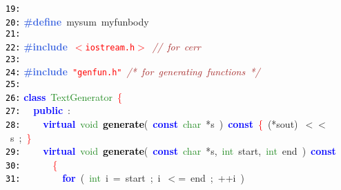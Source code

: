 \documentclass{article}
\begin{document}
\mbox{}\texttt{\textcolor{Black}{19:}}  \\
\mbox{}\texttt{\textcolor{Black}{20:}} \textbf{\textcolor{RoyalBlue}{\#define}}\ \label{test.h:20}mysum\ myfunbody\  \\
\mbox{}\texttt{\textcolor{Black}{21:}}  \\
\mbox{}\texttt{\textcolor{Black}{22:}} \textbf{\textcolor{RoyalBlue}{\#include}}\ \texttt{\textcolor{Red}{$<$iostream.h$>$}}\ \textit{\textcolor{Brown}{//\ for\ cerr}} \\
\mbox{}\texttt{\textcolor{Black}{23:}}  \\
\mbox{}\texttt{\textcolor{Black}{24:}} \textbf{\textcolor{RoyalBlue}{\#include}}\ \texttt{\textcolor{Red}{"{}genfun.h"{}}}\ \textit{\textcolor{Brown}{/*\ for\ generating\ functions\ */}} \\
\mbox{}\texttt{\textcolor{Black}{25:}}  \\
\mbox{}\texttt{\textcolor{Black}{26:}} \textbf{\textcolor{Blue}{class}}\ \textcolor{ForestGreen}{\label{test.h:26}TextGenerator}\ \textcolor{Red}{\{} \\
\mbox{}\texttt{\textcolor{Black}{27:}} \ \ \textbf{\textcolor{Blue}{public}}\ \textcolor{BrickRed}{:} \\
\mbox{}\texttt{\textcolor{Black}{28:}} \ \ \ \ \textbf{\textcolor{Blue}{virtual}}\ \textcolor{ForestGreen}{void}\ \textbf{\textcolor{Black}{\label{test.h:28}generate}}\textcolor{BrickRed}{(}\ \textbf{\textcolor{Blue}{const}}\ \textcolor{ForestGreen}{char}\ \textcolor{BrickRed}{*}s\ \textcolor{BrickRed}{)}\ \textbf{\textcolor{Blue}{const}}\ \textcolor{Red}{\{}\ \textcolor{BrickRed}{(*}sout\textcolor{BrickRed}{)}\ \textcolor{BrickRed}{$<$$<$}\ s\ \textcolor{BrickRed}{;}\ \textcolor{Red}{\}} \\
\mbox{}\texttt{\textcolor{Black}{29:}} \ \ \ \ \textbf{\textcolor{Blue}{virtual}}\ \textcolor{ForestGreen}{void}\ \textbf{\textcolor{Black}{\label{test.h:29}generate}}\textcolor{BrickRed}{(}\ \textbf{\textcolor{Blue}{const}}\ \textcolor{ForestGreen}{char}\ \textcolor{BrickRed}{*}s\textcolor{BrickRed}{,}\ \textcolor{ForestGreen}{int}\ start\textcolor{BrickRed}{,}\ \textcolor{ForestGreen}{int}\ end\ \textcolor{BrickRed}{)}\ \textbf{\textcolor{Blue}{const}}\  \\
\mbox{}\texttt{\textcolor{Black}{30:}} \ \ \ \ \ \ \textcolor{Red}{\{} \\
\mbox{}\texttt{\textcolor{Black}{31:}} \ \ \ \ \ \ \ \ \textbf{\textcolor{Blue}{for}}\ \textcolor{BrickRed}{(}\ \textcolor{ForestGreen}{int}\ i\ \textcolor{BrickRed}{=}\ start\ \textcolor{BrickRed}{;}\ i\ \textcolor{BrickRed}{$<$=}\ end\ \textcolor{BrickRed}{;}\ \textcolor{BrickRed}{++}i\ \textcolor{BrickRed}{)} \\
\end{document}

